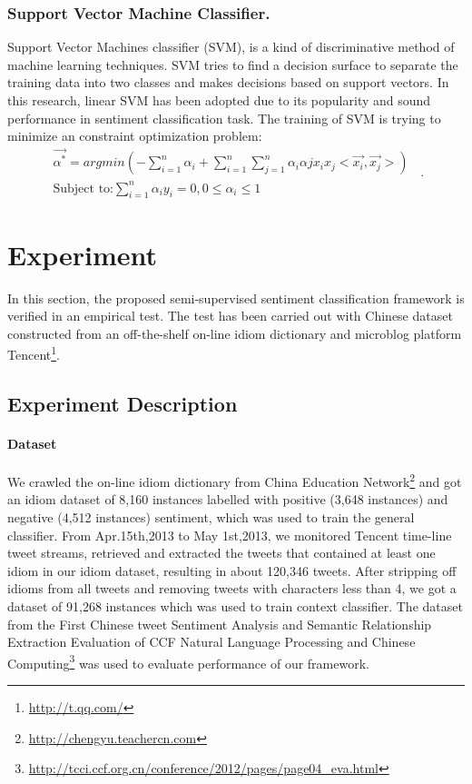\begin{definition}[假设]
\subsubsection{Support Vector Machine Classifier.}
\label{svm}
Support Vector Machines classifier (SVM), is a kind of discriminative method of machine learning techniques.
SVM tries to find a decision surface to separate the training data into two classes and makes decisions based on support vectors. 
In this research, linear SVM has been adopted due to its popularity and sound performance in sentiment classification task.
The training of SVM is trying to minimize an constraint optimization problem:
\begin{equation}
\label{e7}
\begin{aligned}
\overrightarrow{\alpha^{\ast}}=argmin \left( -\sum_{i=1}^{n}\alpha_{i} + \sum_{i=1}^{n} \sum_{j=1}^{n}\alpha_{i}\alpha{j} x_{i}x_{j}<\overrightarrow{x_{i}},\overrightarrow{x_{j}}> \right)\\
\mbox{Subject to:} \sum_{i=1}^{n}\alpha_{i}y_{i}=0 , 0\leqslant \alpha_{i} \leqslant 1
\end{aligned} \enspace .
\end{equation}

\section{Experiment}
\label{experiment}

In this section, the proposed semi-supervised sentiment classification framework is verified in an empirical test. 
The test has been carried out with Chinese dataset constructed from an off-the-shelf on-line idiom dictionary and microblog platform Tencent\footnote{\url{http://t.qq.com/}}. 

\subsection{Experiment Description}
\label{description}

\paragraph{Dataset}
We crawled the on-line idiom dictionary from China Education Network\footnote{\url{http://chengyu.teachercn.com}} and got an idiom dataset of 8,160 instances labelled with positive (3,648 instances) and negative (4,512 instances) sentiment, which was used to train the general classifier. 
From Apr.15th,2013 to May 1st,2013, we monitored Tencent time-line tweet streams, retrieved and extracted the tweets that contained at least one idiom in our idiom dataset, resulting in about 120,346 tweets. 
After stripping off idioms from all tweets and removing tweets with characters less than 4, we got a dataset of 91,268 instances which was used to train context classifier. 
The dataset from the First Chinese tweet Sentiment Analysis and Semantic Relationship Extraction Evaluation of CCF Natural Language Processing and Chinese Computing\footnote{\url{http://tcci.ccf.org.cn/conference/2012/pages/page04_eva.html}} was used to evaluate performance of our framework. 

\end{definition}
